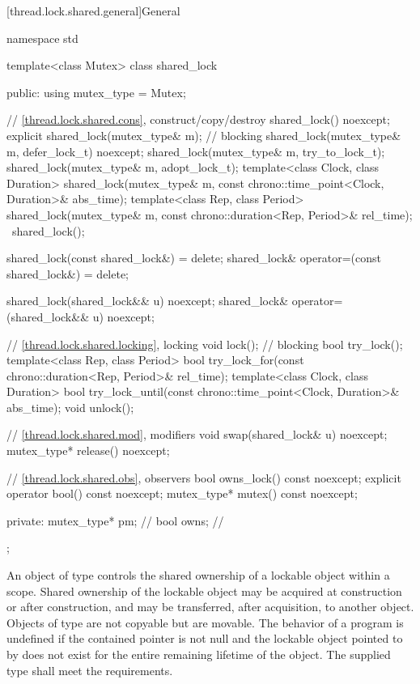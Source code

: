 [thread.lock.shared.general]{General}

%
\begin{codeblock}
namespace std {
  template<class Mutex>
  class shared_lock {
  public:
    using mutex_type = Mutex;

    // \ref{thread.lock.shared.cons}, construct/copy/destroy
    shared_lock() noexcept;
    explicit shared_lock(mutex_type& m);        // blocking
    shared_lock(mutex_type& m, defer_lock_t) noexcept;
    shared_lock(mutex_type& m, try_to_lock_t);
    shared_lock(mutex_type& m, adopt_lock_t);
    template<class Clock, class Duration>
      shared_lock(mutex_type& m, const chrono::time_point<Clock, Duration>& abs_time);
    template<class Rep, class Period>
      shared_lock(mutex_type& m, const chrono::duration<Rep, Period>& rel_time);
    ~shared_lock();

    shared_lock(const shared_lock&) = delete;
    shared_lock& operator=(const shared_lock&) = delete;

    shared_lock(shared_lock&& u) noexcept;
    shared_lock& operator=(shared_lock&& u) noexcept;

    // \ref{thread.lock.shared.locking}, locking
    void lock();                                // blocking
    bool try_lock();
    template<class Rep, class Period>
      bool try_lock_for(const chrono::duration<Rep, Period>& rel_time);
    template<class Clock, class Duration>
      bool try_lock_until(const chrono::time_point<Clock, Duration>& abs_time);
    void unlock();

    // \ref{thread.lock.shared.mod}, modifiers
    void swap(shared_lock& u) noexcept;
    mutex_type* release() noexcept;

    // \ref{thread.lock.shared.obs}, observers
    bool owns_lock() const noexcept;
    explicit operator bool() const noexcept;
    mutex_type* mutex() const noexcept;

  private:
    mutex_type* pm;                             // \expos
    bool owns;                                  // \expos
  };
}
\end{codeblock}

\pnum
An object of type  controls the shared ownership of a
lockable object within a scope. Shared ownership of the lockable object may be
acquired at construction or after construction, and may be transferred, after
acquisition, to another  object. Objects of type
 are not copyable but are movable. The behavior of a program
is undefined if the contained pointer  is not null and the lockable
object pointed to by  does not exist for the entire remaining
lifetime of the  object. The supplied
 type shall meet the 
requirements.

